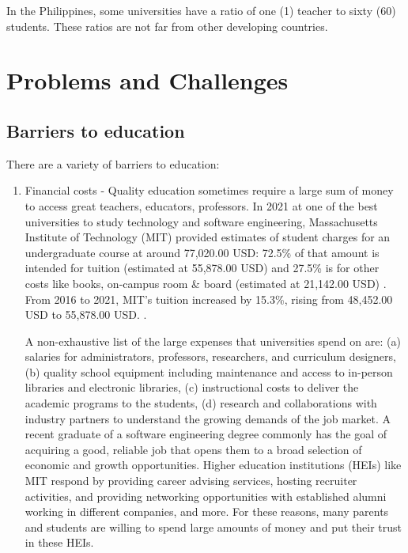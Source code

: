 \documentclass[journal, onecolumn]{IEEEtran}
\begin{document}
In the Philippines, some universities have a ratio of one (1) teacher to sixty (60)
students. These ratios are not far from other developing countries.

\section{Problems and Challenges} 
\label{sec:problems_challenges}

\subsection{Barriers to education}

There are a variety of barriers to education:

\begin{enumerate}
  \item Financial costs - Quality education sometimes require a large sum of 
  money to access great teachers, educators, professors. In  2021 at one of the best universities to study 
  technology and software engineering, Massachusetts Institute of Technology (MIT) provided estimates of student 
  charges for an undergraduate course at around 77,020.00 USD: 72.5\% of that amount is intended for tuition 
  (estimated at 55,878.00 USD) and 27.5\% is for other costs like books, on-campus room \& board (estimated at 21,142.00 USD) \cite{b8}.
  From 2016 to 2021, MIT's tuition increased by 15.3\%, rising from 48,452.00 USD to 55,878.00 USD. \cite{b8}.
  
  A non-exhaustive list of the large expenses that universities spend on are: (a) salaries for administrators, professors, researchers, 
  and curriculum designers, (b) quality school equipment including maintenance and access to in-person libraries 
  and electronic libraries, (c) instructional costs to deliver the academic programs to the students, (d) 
  research and collaborations with industry partners to understand the growing demands of the job market. 
  A recent graduate of a software engineering degree commonly has the goal of acquiring a good, reliable job that 
  opens them to a broad selection of economic and growth opportunities.
  Higher education institutions (HEIs) like MIT respond by providing career advising services, hosting recruiter activities, and
  providing networking opportunities with established alumni working in different companies, and more.  
  For these reasons, many parents and students are willing to spend large amounts of money and 
  put their trust in these HEIs.


\end{enumerate}
\end{document}
